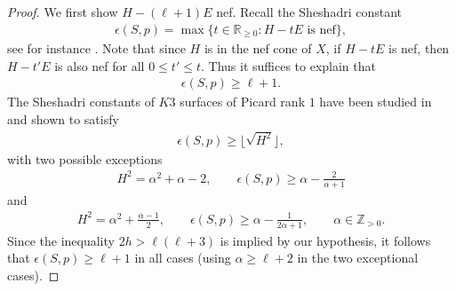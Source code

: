 \documentclass[pdftex]{sigma}
\numberwithin{equation}{section}
\begin{document}
\begin{proof} We first show $H-(\ell+1) E$ nef. Recall the Sheshadri constant
\begin{gather*}
\epsilon (S, p)= \max \{t \in \mathbb R_{\geq 0}\colon H-tE \text{ is nef}\},
\end{gather*}
see for instance \cite[Definition 5.1.1]{L-I}. Note that since $H$ is in the nef cone of $X$, if $H-tE$ is nef, then $H-t'E$ is also nef for all $0\leq t'\leq t$. Thus it suffices to explain that
\begin{gather*}
\epsilon(S, p)\geq \ell+1.
\end{gather*}
The Sheshadri constants of $K3$ surfaces of Picard rank $1$ have been studied in \cite{K} and shown to satisfy
\begin{gather*}
\epsilon(S, p)\geq \big\lfloor {\sqrt{H^2}}\big\rfloor,
\end{gather*}
with two possible exceptions
\begin{gather*}
H^2=\alpha^2+\alpha-2,\qquad \epsilon(S, p)\geq \alpha - \frac{2}{\alpha+1}
\end{gather*}
and
\begin{gather*}
H^2=\alpha^2+\frac{\alpha-1}{2},\qquad \epsilon(S, p)\geq \alpha -\frac{1}{2\alpha+1}, \qquad \alpha\in \mathbb Z_{>0}.
\end{gather*}
Since the inequality $2h>\ell(\ell+3)$ is implied by our hypothesis, it follows that $\epsilon(S, p)\geq \ell+1$ in all cases (using $\alpha\geq \ell+2$ in the two exceptional cases).


\end{proof}
\end{document}
